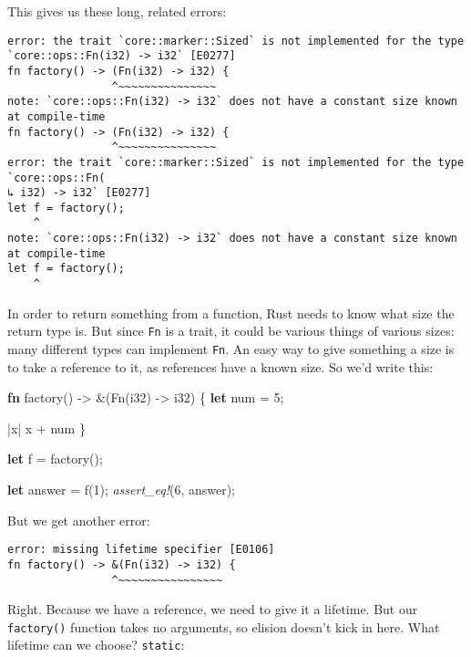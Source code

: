 \documentclass[a4paper,]{book}
\newenvironment{Shaded}{\begin{snugshade}}{\end{snugshade}}
\newcommand{\KeywordTok}[1]{\textcolor[rgb]{0.13,0.29,0.53}{\textbf{{#1}}}}
\newcommand{\DataTypeTok}[1]{\textcolor[rgb]{0.13,0.29,0.53}{{#1}}}
\newcommand{\DecValTok}[1]{\textcolor[rgb]{0.00,0.00,0.81}{{#1}}}
\newcommand{\BuiltInTok}[1]{{#1}}
\newcommand{\PreprocessorTok}[1]{\textcolor[rgb]{0.56,0.35,0.01}{\textit{{#1}}}}
\newcommand{\NormalTok}[1]{{#1}}
\begin{document}
This gives us these long, related errors:

\begin{verbatim}
error: the trait `core::marker::Sized` is not implemented for the type
`core::ops::Fn(i32) -> i32` [E0277]
fn factory() -> (Fn(i32) -> i32) {
                ^~~~~~~~~~~~~~~~
note: `core::ops::Fn(i32) -> i32` does not have a constant size known at compile-time
fn factory() -> (Fn(i32) -> i32) {
                ^~~~~~~~~~~~~~~~
error: the trait `core::marker::Sized` is not implemented for the type `core::ops::Fn(
↳ i32) -> i32` [E0277]
let f = factory();
    ^
note: `core::ops::Fn(i32) -> i32` does not have a constant size known at compile-time
let f = factory();
    ^
\end{verbatim}

In order to return something from a function, Rust needs to know what
size the return type is. But since \texttt{Fn} is a trait, it could be
various things of various sizes: many different types can implement
\texttt{Fn}. An easy way to give something a size is to take a reference
to it, as references have a known size. So we'd write this:

\begin{Shaded}
\begin{Highlighting}[]
\KeywordTok{fn} \NormalTok{factory() -> &(}\BuiltInTok{Fn}\NormalTok{(}\DataTypeTok{i32}\NormalTok{) -> }\DataTypeTok{i32}\NormalTok{) \{}
    \KeywordTok{let} \NormalTok{num = }\DecValTok{5}\NormalTok{;}

    \NormalTok{|x| x + num}
\NormalTok{\}}

\KeywordTok{let} \NormalTok{f = factory();}

\KeywordTok{let} \NormalTok{answer = f(}\DecValTok{1}\NormalTok{);}
\PreprocessorTok{assert_eq!}\NormalTok{(}\DecValTok{6}\NormalTok{, answer);}
\end{Highlighting}
\end{Shaded}

But we get another error:

\begin{verbatim}
error: missing lifetime specifier [E0106]
fn factory() -> &(Fn(i32) -> i32) {
                ^~~~~~~~~~~~~~~~~
\end{verbatim}

Right. Because we have a reference, we need to give it a lifetime. But
our \texttt{factory()} function takes no arguments, so elision doesn't
kick in here. What lifetime can we choose?
\texttt{\textquotesingle{}static}:
\end{document}
